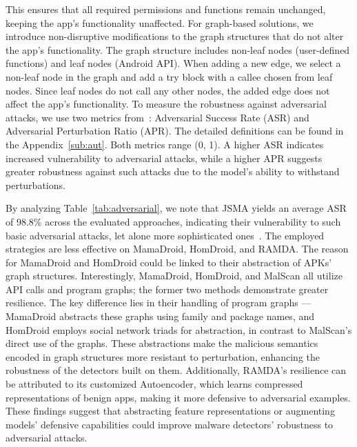 This ensures that all required permissions and functions remain unchanged, keeping the app's functionality unaffected.
For graph-based solutions, we introduce non-disruptive modifications to the graph structures that do not alter the app's functionality.
The graph structure includes non-leaf nodes (user-defined functions) and leaf nodes (Android API). 
When adding a new edge, we select a non-leaf node in the graph and add a try block with a callee chosen from leaf nodes.
Since leaf nodes do not call any other nodes, the added edge does not affect the app's functionality.
To measure the robustness against adversarial attacks, we use two metrics from~\cite{li2023black}: Adversarial Success Rate (ASR) and Adversarial Perturbation Ratio (APR).
The detailed definitions can be found in the Appendix~\ref{sub:aut}.
Both metrics range (0, 1).
A higher ASR indicates increased vulnerability to adversarial attacks, while a higher APR suggests greater robustness against such attacks due to the model's ability to withstand perturbations.

By analyzing Table~\ref{tab:adversarial}, we note that JSMA yields an average ASR of 98.8\% across the evaluated approaches, indicating their vulnerability to such basic adversarial attacks, let alone more sophisticated ones~\cite{he2023efficient}.
The employed strategies are less effective on MamaDroid, HomDroid, and RAMDA.
The reason for MamaDroid and HomDroid could be linked to their abstraction of APKs' graph structures.
Interestingly, MamaDroid, HomDroid, and MalScan all utilize API calls and program graphs; the former two methods demonstrate greater resilience.
The key difference lies in their handling of program graphs --- MamaDroid abstracts these graphs using family and package names, and HomDroid employs social network triads for abstraction, in contrast to MalScan's direct use of the graphs.
These abstractions make the malicious semantics encoded in graph structures more resistant to perturbation, enhancing the robustness of the detectors built on them.
Additionally, RAMDA's resilience can be attributed to its customized Autoencoder, which learns compressed representations of benign apps, making it more defensive to adversarial examples.
These findings suggest that abstracting feature representations or augmenting models' defensive capabilities could improve malware detectors' robustness to adversarial attacks.

